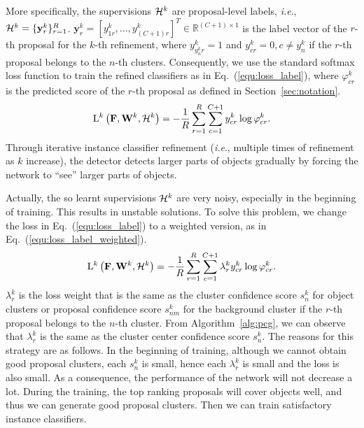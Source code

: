 \documentclass[10pt,journal,compsoc]{IEEEtran}
\def\ie{\emph{i.e}.} \def\Ie{\emph{I.e}.}
\begin{document}
More specifically, the supervisions ${\cal H}^{k}$ are proposal-level labels,
\ie, ${\cal H}^{k} = \{\mathbf{y}^{k}_{r}\}_{r=1}^{R}$.
$\mathbf{y}^{k}_{r} = [y^{k}_{1r}, ..., y^{k}_{(C+1)r}]^{T} \in \mathbb{R}^{(C+1) \times 1}$
is the label vector of the $r$-th proposal for the $k$-th refinement,
where $y^{k}_{y^{k}_{n}r} = 1$ and $y^{k}_{cr} = 0, c \neq y^{k}_{n}$ if the $r$-th proposal belongs to the $n$-th clusters.
Consequently, we use the standard softmax loss function to train the refined classifiers as in Eq.~(\ref{equ:loss_label}),
where $\varphi^{k}_{cr}$ is the predicted score of the $r$-th proposal as defined in Section~\ref{sec:notation}.
\begin{equation}
\label{equ:loss_label}
   \mathrm{L}^{k}\left(\mathbf{F}, \mathbf{W}^{k}, {\cal H}^{k}\right) = -\frac{1}{R}\mathop{\sum} \limits_{r=1}^{R} \sum_{c=1}^{C+1} y^{k}_{cr} \log \varphi^{k}_{cr}.
\end{equation}
Through iterative instance classifier refinement (\ie, multiple times of refinement as $k$ increase),
the detector detects larger parts of objects gradually by forcing the network to ``see'' larger parts of objects.

Actually, the so learnt supervisions ${\cal H}^{k}$ are very noisy,
especially in the beginning of training.
This results in unstable solutions.
To solve this problem, we change the loss in Eq.~(\ref{equ:loss_label}) to a weighted version, as in Eq.~(\ref{equ:loss_label_weighted}).
\begin{equation}
\label{equ:loss_label_weighted}
   \mathrm{L}^{k}\left(\mathbf{F}, \mathbf{W}^{k}, {\cal H}^{k}\right) = -\frac{1}{R}\mathop{\sum} \limits_{r=1}^{R} \sum_{c=1}^{C+1} \lambda^{k}_{r} y^{k}_{cr} \log \varphi^{k}_{cr}.
\end{equation}
$\lambda^{k}_{r}$ is the loss weight that is the same as the cluster confidence score $s^{k}_{n}$ for object clusters or proposal confidence score $s^{k}_{nm}$ for the background cluster
if the $r$-th proposal belongs to the $n$-th cluster.
From Algorithm~\ref{alg:pcg}, we can observe that $\lambda^{k}_{r}$ is the same as the cluster center confidence score $s^{k}_{n}$.
The reasons for this strategy are as follows.
In the beginning of training,
although we cannot obtain good proposal clusters,
each $s^{k}_{n}$ is small, hence each $\lambda^{k}_{r}$ is small and the loss is also small.
As a consequence, the performance of the network will not decrease a lot.
During the training, the top ranking proposals will cover objects well,
and thus we can generate good proposal clusters.
Then we can train satisfactory instance classifiers.
\end{document}
